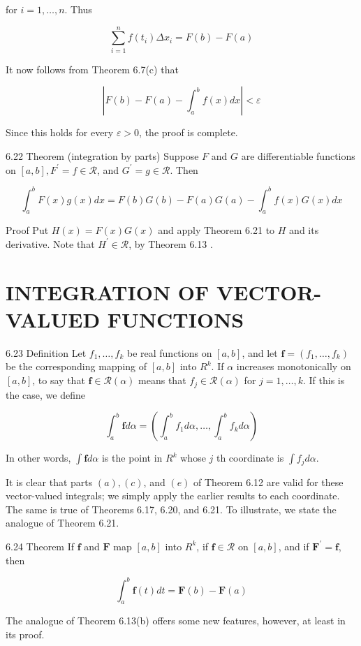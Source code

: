 \documentclass[10pt]{article}
\begin{document}
for $i=1, \ldots, n$. Thus

$$
\sum_{i=1}^{n} f\left(t_{i}\right) \Delta x_{i}=F(b)-F(a)
$$

It now follows from Theorem 6.7(c) that

$$
\left|F(b)-F(a)-\int_{a}^{b} f(x) d x\right|<\varepsilon
$$

Since this holds for every $\varepsilon>0$, the proof is complete.

6.22 Theorem (integration by parts) Suppose $F$ and $G$ are differentiable functions on $[a, b], F^{\prime}=f \in \mathscr{R}$, and $G^{\prime}=g \in \mathscr{R}$. Then

$$
\int_{a}^{b} F(x) g(x) d x=F(b) G(b)-F(a) G(a)-\int_{a}^{b} f(x) G(x) d x
$$

Proof Put $H(x)=F(x) G(x)$ and apply Theorem 6.21 to $H$ and its derivative. Note that $H^{\prime} \in \mathscr{R}$, by Theorem 6.13 .

\section{INTEGRATION OF VECTOR-VALUED FUNCTIONS}
6.23 Definition Let $f_{1}, \ldots, f_{k}$ be real functions on $[a, b]$, and let $\mathbf{f}=\left(f_{1}, \ldots, f_{k}\right)$ be the corresponding mapping of $[a, b]$ into $R^{k}$. If $\alpha$ increases monotonically on $[a, b]$, to say that $\mathbf{f} \in \mathscr{R}(\alpha)$ means that $f_{j} \in \mathscr{R}(\alpha)$ for $j=1, \ldots, k$. If this is the case, we define

$$
\int_{a}^{b} \mathbf{f} d \alpha=\left(\int_{a}^{b} f_{1} d \alpha, \ldots, \int_{a}^{b} f_{k} d \alpha\right)
$$

In other words, $\int \mathbf{f} d \alpha$ is the point in $R^{k}$ whose $j$ th coordinate is $\int f_{j} d \alpha$.

It is clear that parts $(a),(c)$, and $(e)$ of Theorem 6.12 are valid for these vector-valued integrals; we simply apply the earlier results to each coordinate. The same is true of Theorems 6.17, 6.20, and 6.21. To illustrate, we state the analogue of Theorem 6.21.

6.24 Theorem If $\mathbf{f}$ and $\mathbf{F}$ map $[a, b]$ into $R^{k}$, if $\mathbf{f} \in \mathscr{R}$ on $[a, b]$, and if $\mathbf{F}^{\prime}=\mathbf{f}$, then

$$
\int_{a}^{b} \mathbf{f}(t) d t=\mathbf{F}(b)-\mathbf{F}(a)
$$

The analogue of Theorem 6.13(b) offers some new features, however, at least in its proof.
\end{document}
